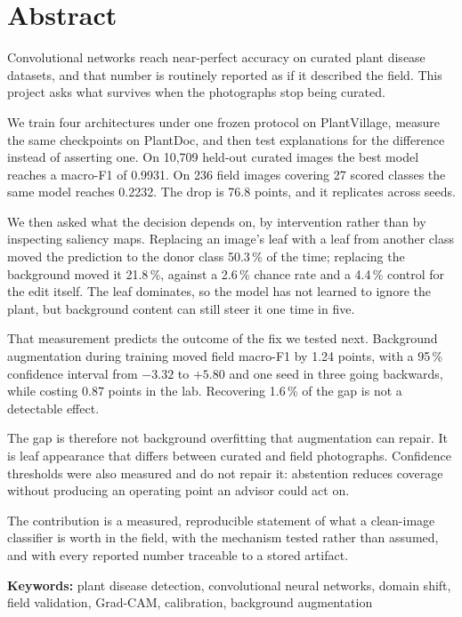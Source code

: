 
\chapter*{Abstract}
\thispagestyle{plain}

Convolutional networks reach near-perfect accuracy on curated plant disease
datasets, and that number is routinely reported as if it described the field. This
project asks what survives when the photographs stop being curated.

We train four architectures under one frozen protocol on PlantVillage, measure the
same checkpoints on PlantDoc, and then test explanations for the difference instead
of asserting one. On 10,709 held-out curated images the best model reaches a
macro-F1 of 0.9931. On 236 field images covering 27 scored classes the same model
reaches 0.2232. The drop is 76.8 points, and it replicates across seeds.

We then asked what the decision depends on, by intervention rather than by
inspecting saliency maps. Replacing an image's leaf with a leaf from another class
moved the prediction to the donor class 50.3\,\% of the time; replacing the
background moved it 21.8\,\%, against a 2.6\,\% chance rate and a 4.4\,\% control
for the edit itself. The leaf dominates, so the model has not learned to ignore the
plant, but background content can still steer it one time in five.

That measurement predicts the outcome of the fix we tested next. Background
augmentation during training moved field macro-F1 by 1.24 points, with a 95\,\%
confidence interval from $-3.32$ to $+5.80$ and one seed in three going backwards,
while costing 0.87 points in the lab. Recovering 1.6\,\% of the gap is not a
detectable effect.

The gap is therefore not background overfitting that augmentation can repair. It is
leaf appearance that differs between curated and field photographs. Confidence
thresholds were also measured and do not repair it: abstention reduces coverage
without producing an operating point an advisor could act on.

The contribution is a measured, reproducible statement of what a clean-image
classifier is worth in the field, with the mechanism tested rather than assumed,
and with every reported number traceable to a stored artifact.

\vspace{0.6cm}
\noindent\textbf{Keywords:} plant disease detection, convolutional neural networks,
domain shift, field validation, Grad-CAM, calibration, background augmentation
